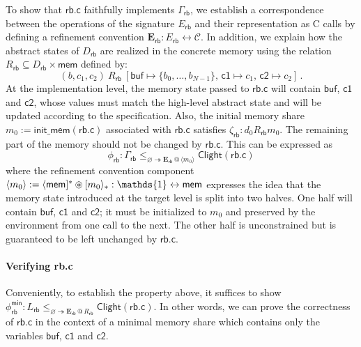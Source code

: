 \documentclass[acmsmall,nonacm]{acmart}
\newcommand{\kw}[1]{\ensuremath{ \mathsf{#1} }}
\newcommand{\sepconj}{\oast}
\newcommand{\mathbbm}[1]{\mathds{#1}}
\begin{document}
\begin{example} %
To show that $\kw{rb.c}$
faithfully implements $\Gamma_\kw{rb}$,
we establish a correspondence
between the operations of the signature $E_\kw{rb}$
and their representation as C calls
by defining a refinement convention
$\mathbf{E}_\kw{rb} : E_\kw{rb} \leftrightarrow \mathcal{C}$.
In addition,
we explain how the abstract states of $D_\kw{rb}$
are realized in the concrete memory
using the relation
$R_\kw{rb} \subseteq D_\kw{rb} \times \kw{mem}$
defined by:
\[
  (b, c_1, c_2) \: \mathrel{R_\kw{rb}} \:
  [\kw{buf} \mapsto \{b_0, \ldots, b_{N-1}\}, \,
   \kw{c1} \mapsto c_1, \,
   \kw{c2} \mapsto c_2]
  \,.
\]
At the implementation level,
the memory state passed to $\kw{rb.c}$
will contain $\kw{buf}$, $\kw{c1}$ and $\kw{c2}$,
whose values must match the high-level abstract state
and will be updated according to the specification.
Also,
the initial memory share $m_0 := \kw{init\_mem}(\kw{rb.c})$
associated with $\kw{rb.c}$ satisfies
$\zeta_\kw{rb} : d_0 \mathrel{R_\kw{rb}} m_0$.
The remaining part of the memory should not be changed by $\kw{rb.c}$.
This can be expressed as
\begin{equation} \label{eqn:rbcorrect}
  \phi_\kw{rb} :
  \Gamma_\kw{rb}
  \le_{\varnothing \twoheadrightarrow
       \mathbf{E}_\kw{rb} \mathbin@ \langle m_0 \rangle }
  \kw{Clight}(\kw{rb.c})
\end{equation}
where the refinement convention component
$\langle m_0 \rangle :=
 \langle \kw{mem} ]^* \sepconj [m_0\rangle_* :
 \mathbbm{1} \leftrightarrow \kw{mem}$
expresses the idea that
the memory state introduced at the target level is split into two halves.
One half will contain $\kw{buf}$, $\kw{c1}$ and $\kw{c2}$;
it must be initialized to $m_0$
and preserved by the environment from one call to the next.
The other half is unconstrained
but is guaranteed to be left unchanged by $\kw{rb.c}$.
\end{example}

\paragraph{Verifying rb.c}Conveniently,
to establish the property above,
it suffices to show
$\phi_\kw{rb}^\kw{min} :
  L_\kw{rb}
  \le_{\varnothing \twoheadrightarrow \mathbf{E}_\kw{rb} \mathbin@ R_\kw{rb}}
  \kw{Clight}(\kw{rb.c})
$.
In other words,
we can prove the correctness of $\kw{rb.c}$
in the context of a minimal memory share
which contains only the variables $\kw{buf}$, $\kw{c1}$ and $\kw{c2}$.
\end{document}
